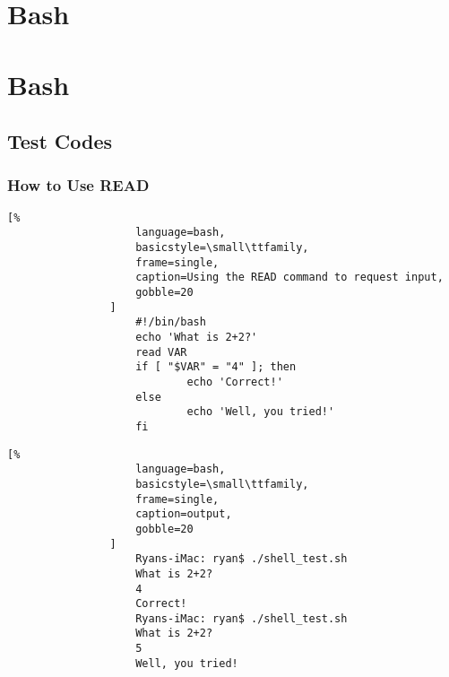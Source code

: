 \documentclass[crop=false,class=article,oneside]{standalone}
\begin{document}
    \ifx\ifcoursesprogrammingtutorials\undefined
        \section*{Bash}
        \setcounter{section}{1}
    \else
        \section{Bash}
    \fi
    \subsection{Test Codes}
        \subsubsection{How to Use READ}
            \begin{minipage}[t]{.48\textwidth}
                \centering
                \begin{lstlisting}[%
                    language=bash,
                    basicstyle=\small\ttfamily,
                    frame=single,
                    caption=Using the READ command to request input,
                    gobble=20
                ]
                    #!/bin/bash
                    echo 'What is 2+2?'
                    read VAR
                    if [ "$VAR" = "4" ]; then
                            echo 'Correct!'
                    else
                            echo 'Well, you tried!'
                    fi
                \end{lstlisting}
            \end{minipage}
            \hfill
            \begin{minipage}[t]{.48\textwidth}
                \centering
                \begin{lstlisting}[%
                    language=bash,
                    basicstyle=\small\ttfamily,
                    frame=single,
                    caption=output,
                    gobble=20
                ]
                    Ryans-iMac: ryan$ ./shell_test.sh 
                    What is 2+2?
                    4
                    Correct!
                    Ryans-iMac: ryan$ ./shell_test.sh 
                    What is 2+2?
                    5
                    Well, you tried!
                \end{lstlisting}
            \end{minipage}
        \newpage
\end{document}
